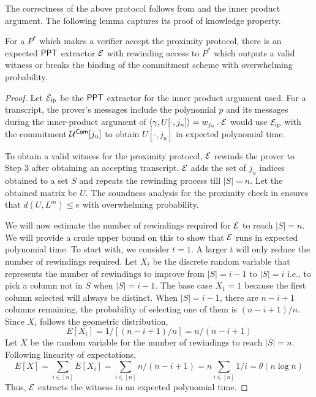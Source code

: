 The correctness of the above protocol follows from \cite{ligero} and the inner product argument. The following lemma captures its proof of knowledge property.
\begin{lemma}\label{lem:proximity}
For a $P^*$ which makes a verifier accept the proximity protocol, there is an expected $\mathsf{PPT}$ extractor $\mathcal{E}$ with rewinding access to $P^*$ which outputs a valid witness or breaks the binding of the commitment scheme with overwhelming probability.
\end{lemma}
\begin{proof}
Let $\mathcal{E}_{\mathrm{ip}}$ be the $\mathsf{PPT}$ extractor for the inner product argument used. For a transcript, the prover's messages include the polynomial $p$ and its messages during the inner-product argument of $\langle \gamma,U[\cdot, j_u]\rangle = w_{j_u}$.
$\mathcal{E}$ would use $\mathcal{E}_{\mathrm{ip}}$ with the commitment $\mathcal{U}^{\mathsf{Com}}[j_u]$ to obtain $U[\cdot,j_u]$ in expected polynomial time. 

To obtain a valid witness for the proximity protocol, $\mathcal{E}$ rewinds the prover to Step 3 after obtaining an accepting transcript. $\mathcal{E}$ adds the set of $j_u$ indices obtained to a set $S$ and repeats the rewinding process till $|S| = n$. Let the obtained matrix be $U$.
The soundness analysis for the proximity check in \cite{ligero} ensures that  $d(U, L^m) \leq e$ with overwhelming probability. 

We will now estimate the number of rewindings required for $\mathcal{E}$ to reach $|S| = n$. We will provide a crude upper bound on this to show that $\mathcal{E}$ runs in expected polynomial time. To start with, we consider $t=1$. A larger $t$ will only reduce the number of rewindings required. Let $X_i$ be the discrete random variable that represents the number of rewindings to improve from $|S| = i-1$ to $|S| = i$ i.e., to pick a column not in $S$ when $|S| = i-1$. The base case $X_1=1$ because the first column selected will always be distinct. When $|S| = i-1$, there are $n-i+1$ columns remaining, the probability of selecting one of them is $(n-i+1)/n$. Since $X_i$ follows the geometric distribution, 
\[
E[X_i] = 1/ [(n-i+1)/n] = n/ (n-i+1)
\]
Let $X$ be the random variable for the number of rewindings to reach $|S| = n$.
Following linearity of expectations, 
\[
E[X] = \sum_{i \in [n]} E[X_i] = \sum_{i \in [n]} n/ (n-i+1) = n \sum_{i \in [n]} 1/i = \theta (n \log n) 
\]
Thus, $\mathcal{E}$ extracts the witness in an expected polynomial time.
\end{proof}

